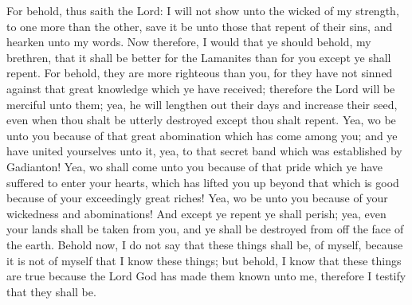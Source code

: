 For behold, thus saith the Lord: I will not show unto the wicked of my strength, to one more than the other, save it be unto those that repent of their sins, and hearken unto my words.  Now therefore, I would that ye should behold, my brethren, that it shall be better for the Lamanites than for you except ye shall repent.
\bverse \iffalse For behold, they are more righteous than you, for they have not sinned against that great knowledge which ye have received; therefore the Lord will be merciful unto them; yea, he will lengthen out their days and increase their seed, even when thou shalt be utterly destroyed except thou shalt repent. \fi
For behold, they are more righteous than you, for they have not sinned against that great knowledge which ye have received; therefore the Lord will be merciful unto them; yea, he will lengthen out their days and increase their seed, even when thou shalt be utterly destroyed except thou shalt repent.
\bverse \iffalse Yea, wo be unto you because of that great abomination which has come among you; and ye have united yourselves unto it, yea, to that secret band which was established by Gadianton! \fi
Yea, wo be unto you because of that great abomination which has come among you; and ye have united yourselves unto it, yea, to that secret band which was established by Gadianton!
\bverse \iffalse Yea, wo shall come unto you because of that pride which ye have suffered to enter your hearts, which has lifted you up beyond that which is good because of your exceedingly great riches! \fi
Yea, wo shall come unto you because of that pride which ye have suffered to enter your hearts, which has lifted you up beyond that which is good because of your exceedingly great riches!
\bverse \iffalse Yea, wo be unto you because of your wickedness and abominations! \fi
Yea, wo be unto you because of your wickedness and abominations!
\bverse \iffalse And except ye repent ye shall perish; yea, even your lands shall be taken from you, and ye shall be destroyed from off the face of the earth. \fi
And except ye repent ye shall perish; yea, even your lands shall be taken from you, and ye shall be destroyed from off the face of the earth.
\bverse \iffalse Behold now, I do not say that these things shall be, of myself, because it is not of myself that I know these things; but behold, I know that these things are true because the Lord God has made them known unto me, therefore I testify that they shall be. \fi
Behold now, I do not say that these things shall be, of myself, because it is not of myself that I know these things; but behold, I know that these things are true because the Lord God has made them known unto me, therefore I testify that they shall be.
